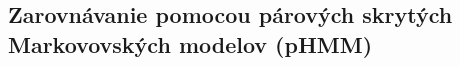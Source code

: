 






\subsection{Zarovnávanie pomocou párových skrytých Markovovských modelov (pHMM)}
\label{subsec:hmm-alignment}

